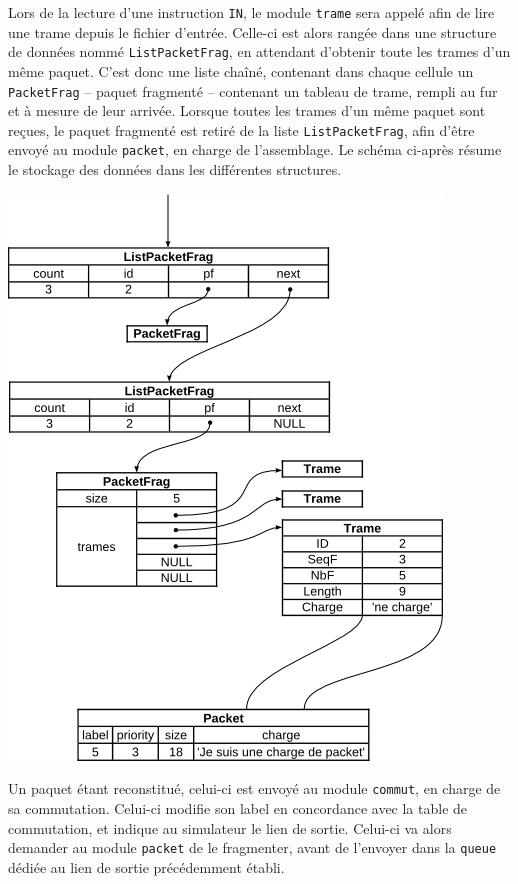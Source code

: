 \documentclass[a4paper,11pt]{article}
\begin{document}
Lors de la lecture d'une instruction \texttt{IN}, le module
\texttt{trame} sera appelé afin de lire une trame depuis le fichier
d'entrée. Celle-ci est alors rangée dans une structure de données
nommé \texttt{ListPacketFrag}, en attendant d'obtenir toute les trames
d'un même paquet. C'est donc une liste chaîné, contenant dans chaque
cellule un \texttt{PacketFrag} – paquet fragmenté – contenant un tableau
de trame, rempli au fur et à mesure de leur arrivée. Lorsque toutes les
trames d'un même paquet sont reçues, le paquet fragmenté est retiré de la
liste \texttt{ListPacketFrag}, afin d'être envoyé au module
\texttt{packet}, en charge de l'assemblage. Le schéma ci-après résume
le stockage des données dans les différentes structures.

\includegraphics{s1.png}

Un paquet étant reconstitué, celui-ci est envoyé au module
\texttt{commut}, en charge de sa commutation. Celui-ci modifie son label
en concordance avec la table de commutation, et indique au simulateur le
lien de sortie. Celui-ci va alors demander au module \texttt{packet} de
le fragmenter, avant de l'envoyer dans la \texttt{queue} dédiée au lien
de sortie précédemment établi.
\end{document}

